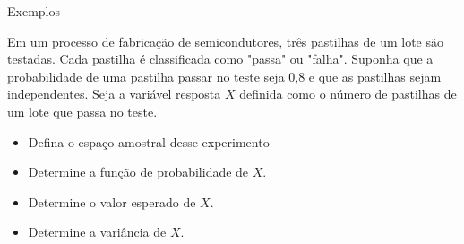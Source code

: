 \begin{frame}{Exemplos}
    \begin{exemplo}[11]
     Em um processo de fabricação de semicondutores, três pastilhas de um lote são testadas. Cada pastilha é classificada como "passa" ou "falha". Suponha que a probabilidade de uma pastilha passar no teste seja 0,8 e que as pastilhas sejam independentes. Seja a variável resposta $X$ definida como o número de pastilhas de um lote que passa no teste. 

     \begin{itemize}
         \item Defina o espaço amostral desse experimento
         \item Determine a função de probabilidade de $X$.
         \item Determine o valor esperado de $X$.
         \item Determine a variância de $X$.
     \end{itemize}
     
\end{exemplo}
\end{frame}











